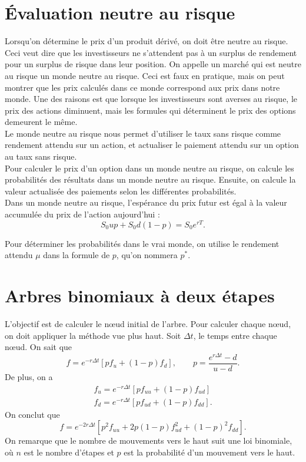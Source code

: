\section{Évaluation neutre au risque}

Lorsqu'on détermine le prix d'un produit dérivé, on doit être neutre au risque. Ceci veut dire que les investisseurs ne s'attendent pas à un surplus de rendement pour un surplus de risque dans leur position. On appelle un marché qui est neutre au risque un monde neutre au risque. Ceci est faux en pratique, mais on peut montrer que les prix calculés dans ce monde correspond aux prix dans notre monde. Une des raisons est que lorsque les investisseurs sont averses au risque, le prix des actions diminuent, mais les formules qui déterminent le prix des options demeurent le même. \\

Le monde neutre au risque nous permet d'utiliser le taux sans risque comme rendement attendu sur un action, et actualiser le paiement attendu sur un option au taux sans risque. \\

Pour calculer le prix d'un option dans un monde neutre au risque, on calcule les probabilités des résultats dans un monde neutre au risque. Ensuite, on calcule la valeur actualisée des paiements selon les différentes probabilités. \\

Dans un monde neutre au risque, l'espérance du prix futur est égal à la valeur accumulée du prix de l'action aujourd'hui : $$S_0 u p + S_0 d (1-p) = S_0 e^{rT}.$$

Pour déterminer les probabilités dans le vrai monde, on utilise le rendement attendu $\mu$ dans la formule de $p$, qu'on nommera $p^*$.

\section{Arbres binomiaux à deux étapes}

L'objectif est de calculer le nœud initial de l'arbre. Pour calculer chaque nœud, on doit appliquer la méthode vue plus haut. Soit $\Delta t$, le temps entre chaque nœud. On sait que 
\begin{equation}\label{eq:arbre-binom}
f = e^{-r\Delta t} \left[p f_u + (1-p) f_d\right], \qquad p = \frac{e^{r\Delta t} - d}{u - d}.
\end{equation}
De plus, on a 
\begin{align*}
f_u = e^{-r\Delta t} \left[p f_{uu} + (1-p) f_{ud}\right]\\
f_d = e^{-r\Delta t} \left[p f_{ud} + (1-p) f_{dd}\right].
\end{align*}
On conclut que 
$$f = e^{-2r\Delta t}\left[p^2 f_{uu} + 2p(1-p) f_{ud}^2 + (1-p)^2 f_{dd}\right].$$
On remarque que le nombre de mouvements vers le haut suit une loi binomiale, où $n$ est le nombre d'étapes et $p$ est la probabilité d'un mouvement vers le haut. 

